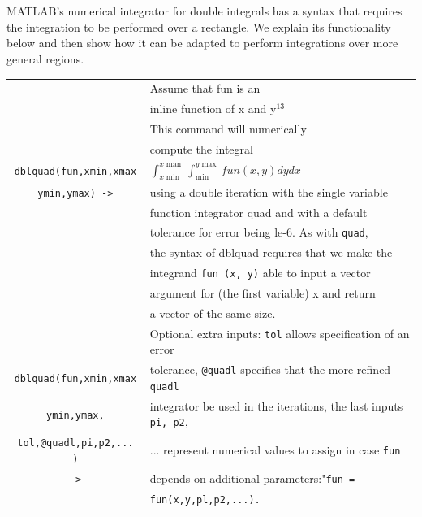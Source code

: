 \documentclass[../main.tex]{subfiles}
\begin{document}
\\
\\
MATLAB's numerical integrator for double integrals has a syntax that requires the integration to be performed over a rectangle. We explain its functionality below and then show how it can be adapted to perform integrations over more general regions.
\begin{center}
\begin{tabular}{|c|l|}
\hline
&Assume that fun is an\\
& inline function of x and y$^{13}$\\
& This command will numerically\\& compute the integral \\
\texttt{dblquad(fun,xmin,xmax} &$\int_{x \min }^{x \operatorname{man}} \int_{\min }^{y \max } f u n(x, y) d y d x$\\ 
\texttt{ymin,ymax) ->}&using a double iteration with the single variable\\
& function integrator quad and with a default\\
& tolerance for error being le-6. As with \texttt{quad},\\
&the syntax of dblquad 
requires that we make the\\
& integrand \texttt{fun (x, y)} able to 
input a vector \\
&argument for (the first variable) x and return\\
& a vector of the same size.\\
\hline
&Optional extra inputs: \texttt{tol} allows specification of an error\\
\texttt{dblquad(fun,xmin,xmax}&tolerance, \texttt{@quadl} specifies that the more refined \texttt{quadl} \\
\texttt{ymin,ymax,}&integrator be used in the iterations, the last inputs \texttt{pi, p2},\\
\texttt{tol,@quadl,pi,p2,... )}& ... represent numerical values to assign in case \texttt{fun}\\
\texttt{->}&depends on additional parameters:"\texttt{fun =} \\
&\texttt{fun(x,y,pl,p2,...).}\\
\hline
\end{tabular}
\end{center}
\end{document}
